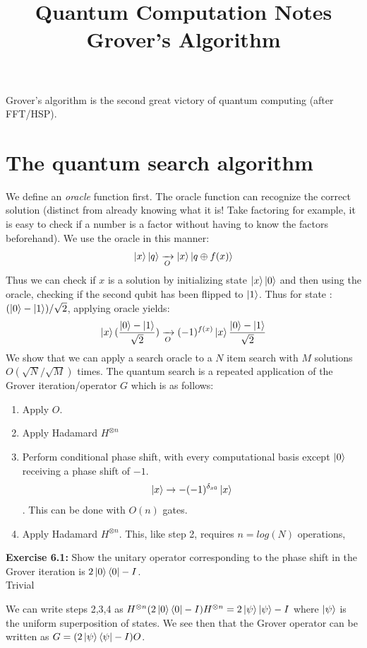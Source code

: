 \documentclass{article}
\title{Quantum Computation Notes \\ \large Grover's Algorithm}
\author{}
\date{}
\begin{document}
\maketitle
Grover's algorithm is the second great victory of quantum computing (after FFT/HSP).\\
\section{The quantum search algorithm}
We define an \textit{oracle} function first. The oracle function can recognize the correct solution (distinct from already knowing what it is! Take factoring for example, it is easy to check if a number is a factor without having to know the factors beforehand). We use the oracle in this manner:
$$\ket{x}\ket{q} \xrightarrow[O]{} \ket{x} \ket{q \oplus f(x)}$$
Thus we can check if $x$ is a solution by initializing state $\ket{x}\ket{0}$ and then using the oracle, checking if the second qubit has been flipped to $\ket{1}$. Thus for state : $(\ket{0} -\ket{1})/\sqrt{2}$, applying oracle yields:
$$\ket{x}(\frac{\ket0 - \ket1}{\sqrt{2}}) \xrightarrow[O]{} (-1)^{f(x)} \ket{x} \frac{\ket0 - \ket1}{\sqrt{2}}$$
We show that we can apply a search oracle to a $N$ item search with $M$ solutions $O(\sqrt{N}/\sqrt{M})$ times. The quantum search is a repeated application of the Grover iteration/operator $G$ which is as follows:
\begin{enumerate}
	\item Apply $O$.
	\item Apply Hadamard $H^{\otimes n}$
	\item Perform conditional phase shift, with every computational basis except $\ket{0}$ receiving a phase shift of $-1$.
		$$\ket{x} \to -(-1)^{\delta_{x0}} \ket{x}$$. This can be done with $O(n)$ gates.
	\item Apply Hadamard $H^{\otimes n}$. This, like step 2, requires $n= log(N)$ operations,
\end{enumerate}
\begin{tcolorbox}\textbf{Exercise 6.1:} Show the unitary operator corresponding to the phase shift in the Grover iteration is $2\ket{0}\bra{0} - I$.\\
Trivial\end{tcolorbox}
We can write steps 2,3,4 as $H^{\otimes n} (2 \ket{0}\bra{0} - I)H^{\otimes n}  = 2\ket{\psi}\ket{\psi} - I$ where $\ket{\psi}$ is the uniform superposition of states.
We see then that the Grover operator can be written as $G  = (2\ket{\psi} \bra{\psi} - I)O$.
\end{document}
